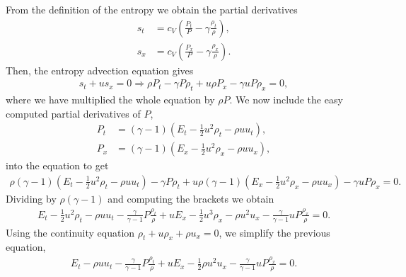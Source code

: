 \begin{questions}

\begin{solution}
From the definition of the entropy we obtain the partial derivatives
\begin{align*}
s_t &= c_V\left(\frac{P_t}{P}-\gamma\frac{\rho_t}{\rho}\right),\\
s_x &= c_V\left(\frac{P_x}{P}-\gamma\frac{\rho_x}{\rho}\right).
\end{align*}
Then, the entropy advection equation gives
\begin{align*}
s_t+us_x=0\Rightarrow \rho P_t-\gamma P\rho_t+u\rho P_x-\gamma uP\rho_x=0,
\end{align*}
where we have multiplied the whole equation by $\rho P$. We now include the easy computed partial derivatives of $P$,
\begin{align*}
P_t &= \left(\gamma-1\right)\left(E_t-\frac{1}{2}u^2\rho_t-\rho u u_t\right),\\
P_x &= \left(\gamma-1\right)\left(E_x-\frac{1}{2}u^2\rho_x-\rho u u_x\right),
\end{align*}
into the equation to get
\begin{align*}
\rho\left(\gamma-1\right)\left(E_t-\frac{1}{2}u^2\rho_t-\rho u u_t\right)-\gamma P\rho_t+u\rho\left(\gamma-1\right)\left(E_x-\frac{1}{2}u^2\rho_x-\rho u u_x\right)-\gamma uP\rho_x=0.
\end{align*}
Dividing by $\rho\left(\gamma-1\right)$ and computing the brackets we obtain
\begin{align*}
E_t-\frac{1}{2}u^2\rho_t-\rho u u_t-\frac{\gamma}{\gamma-1}P\frac{\rho_t}{\rho}+u E_x-\frac{1}{2}u^3\rho_x-\rho u^2 u_x-\frac{\gamma}{\gamma-1}uP\frac{\rho_x}{\rho}=0.
\end{align*}
Using the continuity equation $\rho_t+u\rho_x+\rho u_x=0$, we simplify the previous equation,
\begin{align*}
E_t-\rho u u_t-\frac{\gamma}{\gamma-1}P\frac{\rho_t}{\rho}+u E_x-\frac{1}{2}\rho u^2 u_x-\frac{\gamma}{\gamma-1}uP\frac{\rho_x}{\rho}=0.
\end{align*}

\end{solution}
\end{questions}
